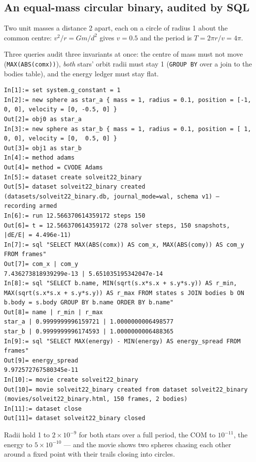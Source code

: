 \documentclass[11pt]{article}
\newcommand{\code}[1]{\texttt{#1}}
\begin{document}
\subsection{An equal-mass circular binary, audited by SQL}

Two unit masses a distance 2 apart, each on a circle of radius 1
about the common centre: $v^2/r = Gm/d^2$ gives $v = 0.5$ and the
period is $T = 2\pi r/v = 4\pi$.

Three queries audit three invariants at once: the centre of mass must
not move (\code{MAX(ABS(comx))}), \emph{both} stars' orbit radii must
stay 1 (\code{GROUP BY} over a join to the bodies table), and the
energy ledger must stay flat.

\begin{lstlisting}
In[1]:= set system.g_constant = 1
In[2]:= new sphere as star_a { mass = 1, radius = 0.1, position = [-1, 0, 0], velocity = [0, -0.5, 0] }
Out[2]= obj0 as star_a
In[3]:= new sphere as star_b { mass = 1, radius = 0.1, position = [ 1, 0, 0], velocity = [0,  0.5, 0] }
Out[3]= obj1 as star_b
In[4]:= method adams
Out[4]= method = CVODE Adams
In[5]:= dataset create solveit22_binary
Out[5]= dataset solveit22_binary created (datasets/solveit22_binary.db, journal_mode=wal, schema v1) — recording armed
In[6]:= run 12.566370614359172 steps 150
Out[6]= t = 12.566370614359172 (278 solver steps, 150 snapshots, |dE/E| = 4.496e-11)
In[7]:= sql "SELECT MAX(ABS(comx)) AS com_x, MAX(ABS(comy)) AS com_y FROM frames"
Out[7]= com_x | com_y
7.436273818939299e-13 | 5.651035195342047e-14
In[8]:= sql "SELECT b.name, MIN(sqrt(s.x*s.x + s.y*s.y)) AS r_min, MAX(sqrt(s.x*s.x + s.y*s.y)) AS r_max FROM states s JOIN bodies b ON b.body = s.body GROUP BY b.name ORDER BY b.name"
Out[8]= name | r_min | r_max
star_a | 0.9999999996159721 | 1.0000000006498577
star_b | 0.9999999996174593 | 1.0000000006488365
In[9]:= sql "SELECT MAX(energy) - MIN(energy) AS energy_spread FROM frames"
Out[9]= energy_spread
9.972572767580345e-11
In[10]:= movie create solveit22_binary
Out[10]= movie solveit22_binary created from dataset solveit22_binary (movies/solveit22_binary.html, 150 frames, 2 bodies)
In[11]:= dataset close
Out[11]= dataset solveit22_binary closed
\end{lstlisting}

Radii hold 1 to $2\times10^{-9}$ for both stars over a full period,
the COM to $10^{-11}$, the energy to $5\times10^{-10}$ --- and the
movie shows two spheres chasing each other around a fixed point with
their trails closing into circles.
\end{document}
